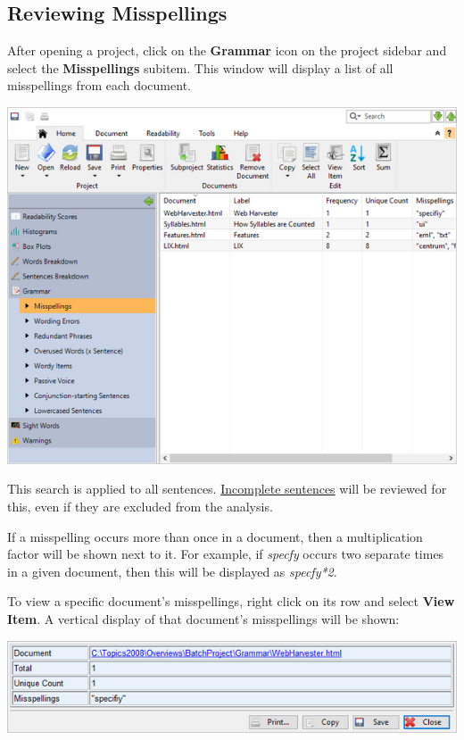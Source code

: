 \documentclass[
]{book}
\theoremstyle{definition}
\theoremstyle{definition}
\theoremstyle{definition}
\theoremstyle{definition}
\theoremstyle{remark}
\begin{document}
\hypertarget{reviewing-batch-misspellings}{%
\subsection*{Reviewing Misspellings}\label{reviewing-batch-misspellings}}

After opening a project, click on the \textbf{Grammar} icon on the project sidebar and select the \textbf{Misspellings} subitem. This window will display a list of all misspellings from each document.

\includegraphics{Images/batchmisspellings.png}

This search is applied to all sentences. \protect\hyperlink{how-text-is-excluded}{Incomplete sentences} will be reviewed for this, even if they are excluded from the analysis.

If a misspelling occurs more than once in a document, then a multiplication factor will be shown next to it. For example, if \emph{specfy} occurs two separate times in a given document, then this will be displayed as \emph{specfy*2}.

To view a specific document's misspellings, right click on its row and select \textbf{View Item}. A vertical display of that document's misspellings will be shown:

\begin{center}\includegraphics[width=0.75\linewidth,]{Images/batchmisspellingsviewitem} \end{center}
\end{document}
